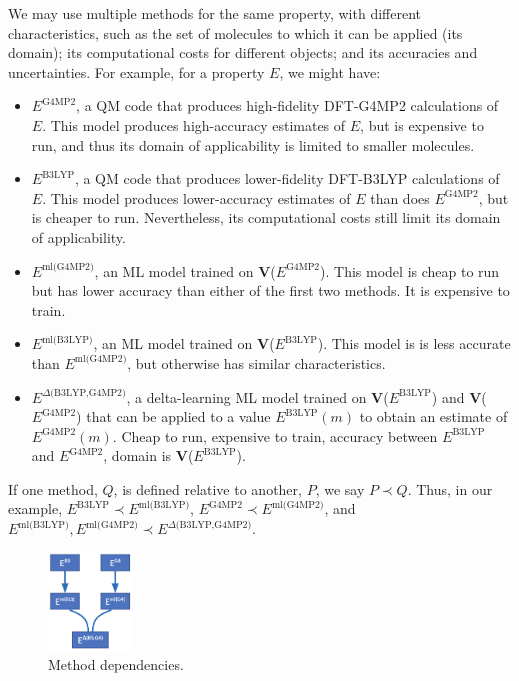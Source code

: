 \documentclass[10pt]{article}
\begin{document}
We may use multiple methods for the same property, with different characteristics, such as the set of molecules to which it can be applied (its domain); 
its computational costs for different objects; and its accuracies and uncertainties.
For example, for a property $E$, we might have:
\begin{itemize}\itemsep-0.2em 
\item
$E^{\textrm{G4MP2}}$, a QM code that produces high-fidelity DFT-G4MP2 calculations of $E$. 
This model produces high-accuracy estimates of $E$, but is expensive to run, and thus its domain of applicability is limited to smaller molecules.
\item
$E^{\textrm{B3LYP}}$, a QM code that produces lower-fidelity DFT-B3LYP calculations of $E$. This model produces lower-accuracy estimates of $E$ than
does $E^{\textrm{G4MP2}}$, but is cheaper to run. Nevertheless, its computational costs still limit its domain of applicability.
\item
$E^{\textrm{ml(G4MP2)}}$, an ML model trained on \textbf{V}($E^{\textrm{G4MP2}}$).
This model is cheap to run but has lower accuracy than either of the first two methods. It is expensive to train.
\item
$E^{\textrm{ml(B3LYP)}}$, an ML model trained on \textbf{V}($E^{\textrm{B3LYP}}$).
This model is is less accurate than $E^{\textrm{ml(G4MP2)}}$, but otherwise has similar characteristics.
\item
$E^{\textrm{$\Delta$(B3LYP,G4MP2)}}$, a delta-learning ML model trained on \textbf{V}($E^{\textrm{B3LYP}}$) and  \textbf{V}($E^{\textrm{G4MP2}}$) 
that can be applied to a value $E^{\textrm{B3LYP}}(m)$ to obtain an estimate of $E^{\textrm{G4MP2}}(m)$.
Cheap to run, expensive to train, accuracy between $E^{\textrm{B3LYP}}$ and $E^{\textrm{G4MP2}}$, domain is \textbf{V}($E^{\textrm{B3LYP}}$).
\end{itemize}

If one method, $Q$, is defined relative to another, $P$, we say $P\prec Q$.
Thus, in our example,
$E^{\textrm{B3LYP}} \prec E^{\textrm{ml(B3LYP)}}$, $E^{\textrm{G4MP2}} \prec E^{\textrm{ml(G4MP2)}}$, and
$E^{\textrm{ml(B3LYP)}}, E^{\textrm{ml(G4MP2)}} \prec E^{\textrm{$\Delta$(B3LYP,G4MP2)}}$.

\begin{figure}
\vspace{-2ex}
  \centering
  \includegraphics[width=0.2\textwidth,trim=0in 0in 0in 0in,clip]{./Figs/deps.png}
  \vspace{-4ex}
  \caption{Method dependencies.
\label{fig:server}}
\end{figure}
\end{document}
